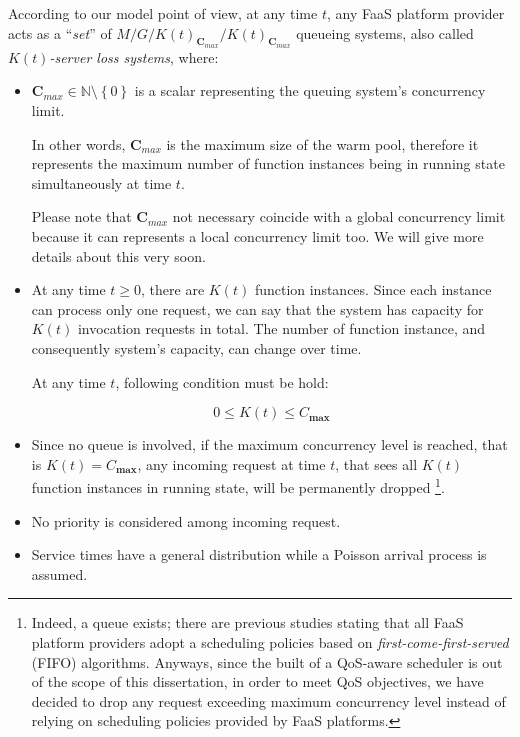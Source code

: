 \documentclass[12pt,a4paper]{report}
\newcommand{\N}{\mathbb{N}}
\begin{document}
According to our model point of view, at any time $t$, any FaaS platform provider acts as a ``\textit{set}'' of $M/G/K(t)_{\textbf{C}_{max}}/K(t)_{\textbf{C}_{max}}$ queueing systems, also called \textit{$K(t)$-server loss systems}, where:

\begin{itemize}
	
	\item $\textbf{C}_{max} \in \N \setminus \left\{0\right\}$ is a scalar representing the queuing system's concurrency limit.
	
	In other words, $\textbf{C}_{max}$ is the maximum size of the warm pool, therefore it represents the maximum number of function instances being in running state simultaneously at time $t$. 
	
	Please note that $\textbf{C}_{max}$ not necessary coincide with a global concurrency limit because it can represents a local concurrency limit too. We will give more details about this very soon.
	
	\item At any time $t \geq 0$, there are $K(t)$ function instances. Since each instance can process only one request, we can say that the system has capacity for $K(t)$ invocation requests in total. The number of function instance, and consequently system's capacity, can change over time. 
	
	At any time $t$, following condition must be hold:
	
	\begin{equation}
		0 \leq K(t) \leq {C}_{\textbf{max}}
	\end{equation}
	
	\item Since no queue is involved, if the maximum concurrency level is reached, that is $K(t) = {C}_{\textbf{max}}$, any incoming request at time $t$, that sees all $K(t)$ function instances in running state, will be permanently dropped \footnote{Indeed, a queue exists; there are previous studies stating that all FaaS platform providers adopt a scheduling policies based on \textit{first-come-first-served} (FIFO) algorithms. Anyways, since the built of a QoS-aware scheduler is out of the scope of this dissertation, in order to meet QoS objectives, we have decided to drop any request exceeding maximum concurrency level instead of relying on scheduling policies provided by FaaS platforms.}.
	
	\item No priority is considered among incoming request.
	
	\item Service times have a general distribution while a Poisson arrival process is assumed.
\end{itemize} 
\end{document}
